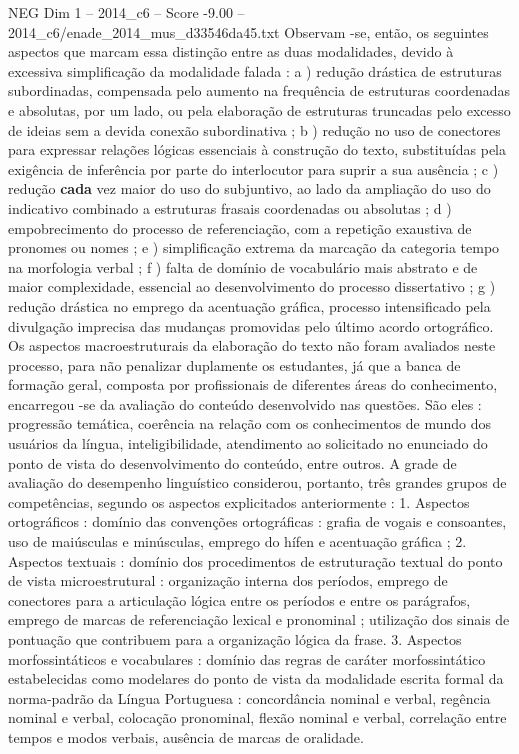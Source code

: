 \begin{textsample}{NEG Dim 1 – 2014\_c6 – Score -9.00 – 2014\_c6/enade\_2014\_mus\_d33546da45.txt}
Observam -se, então, os seguintes aspectos que marcam essa distinção entre as duas modalidades, devido à excessiva simplificação da modalidade falada : a ) redução drástica de estruturas subordinadas, compensada pelo aumento na frequência de estruturas coordenadas e absolutas, por um lado, ou pela elaboração de estruturas truncadas pelo excesso de ideias sem a devida conexão subordinativa ; b ) redução no uso de conectores para expressar relações lógicas essenciais à construção do texto, substituídas pela exigência de inferência por parte do interlocutor para suprir a sua ausência ; c ) redução \textbf{cada} vez maior do uso do subjuntivo, ao lado da ampliação do uso do indicativo combinado a estruturas frasais coordenadas ou absolutas ; d ) empobrecimento do processo de referenciação, com a repetição exaustiva de pronomes ou nomes ; e ) simplificação extrema da marcação da categoria tempo na morfologia verbal ; f ) falta de domínio de vocabulário mais abstrato e de maior complexidade, essencial ao desenvolvimento do processo dissertativo ; g ) redução drástica no emprego da acentuação gráfica, processo intensificado pela divulgação imprecisa das mudanças promovidas pelo último acordo ortográfico.
Os aspectos macroestruturais da elaboração do texto não foram avaliados neste processo, para não penalizar duplamente os estudantes, já que a banca de formação geral, composta por profissionais de diferentes áreas do conhecimento, encarregou -se da avaliação do conteúdo desenvolvido nas questões.
São eles : progressão temática, coerência na relação com os conhecimentos de mundo dos usuários da língua, inteligibilidade, atendimento ao solicitado no enunciado do ponto de vista do desenvolvimento do conteúdo, entre outros.
A grade de avaliação do desempenho linguístico considerou, portanto, três grandes grupos de competências, segundo os aspectos explicitados anteriormente : 1.
Aspectos ortográficos : domínio das convenções ortográficas : grafia de vogais e consoantes, uso de maiúsculas e minúsculas, emprego do hífen e acentuação gráfica ; 2.
Aspectos textuais : domínio dos procedimentos de estruturação textual do ponto de vista microestrutural : organização interna dos períodos, emprego de conectores para a articulação lógica entre os períodos e entre os parágrafos, emprego de marcas de referenciação lexical e pronominal ; utilização dos sinais de pontuação que contribuem para a organização lógica da frase. 3.
Aspectos morfossintáticos e vocabulares : domínio das regras de caráter morfossintático estabelecidas como modelares do ponto de vista da modalidade escrita formal da norma-padrão da Língua Portuguesa : concordância nominal e verbal, regência nominal e verbal, colocação pronominal, flexão nominal e verbal, correlação entre tempos e modos verbais, ausência de marcas de oralidade.

\end{textsample}
